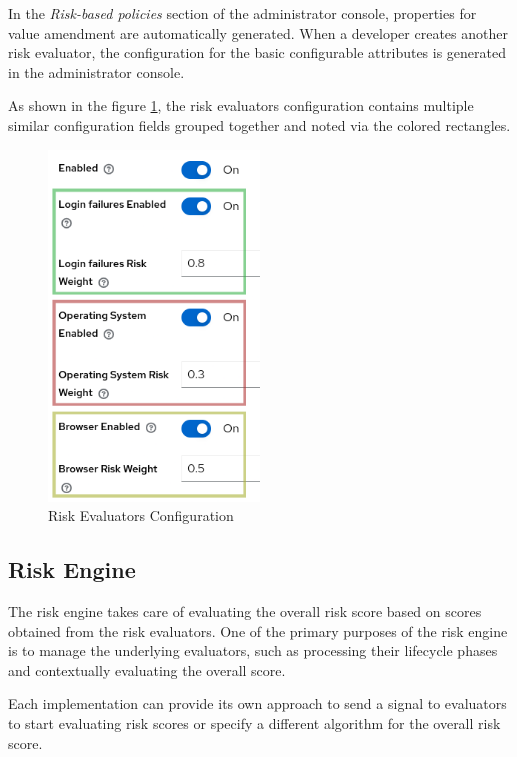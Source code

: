 In the \textit{Risk-based policies} section of the administrator console, properties for value amendment are automatically generated.
When a developer creates another risk evaluator, the configuration for the basic configurable attributes is generated in the administrator console.

As shown in the figure \ref{fig:risk-based-evaluator-config}, the risk evaluators configuration contains multiple similar configuration fields grouped together and noted via the colored rectangles. 

\begin{figure}[htbp]
  \centering
  \includegraphics[width=0.5\textwidth]{img/sections/5-design/risk-evaluators-config.png}
  \caption{Risk Evaluators Configuration}
  \label{fig:risk-based-evaluator-config}
\end{figure}

\newpage
\subsection{Risk Engine} \label{risk-engine}
The risk engine takes care of evaluating the overall risk score based on scores obtained from the risk evaluators.
One of the primary purposes of the risk engine is to manage the underlying evaluators, such as processing their lifecycle phases and contextually evaluating the overall score.

Each implementation can provide its own approach to send a signal to evaluators to start evaluating risk scores or specify a different algorithm for the overall risk score.

